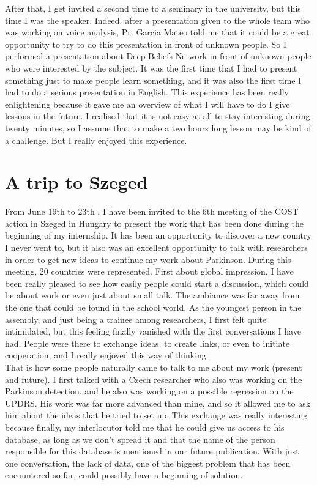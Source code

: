 \documentclass{report}
\begin{document}
		After that, I get invited a second time to a seminary in the university, but this time I was the speaker.  Indeed, after a presentation given to the whole team who was working on voice analysis, Pr. Garcia Mateo told me that it could be a great opportunity to try to do this presentation in front of unknown people. So I performed a presentation about Deep Beliefs Network in front of unknown people who were interested by the subject. It was the first time that I had to present something just to make people learn something, and it was also the first time I had to do a serious presentation in English. This experience has been really enlightening because it gave me an overview of what I will have to do I give lessons in the future. I realised that it is not easy at all to stay interesting during twenty minutes, so I assume that to make a two hours long lesson may be kind of a challenge. But I really enjoyed this experience.
		
		\section{A trip to Szeged}
		
		From June 19th to 23th   , I have been invited to the 6th meeting of the COST action in Szeged in Hungary to present the work that has been done during the beginning of my internship. It has been an opportunity to discover a new country I never went to, but it also was an excellent opportunity to talk with researchers in order to get new ideas to continue my work about Parkinson. During this meeting, 20 countries were represented.
		First about global impression, I have been really pleased to see how easily people could start a discussion, which could be about work or even just about small talk. The ambiance was far away from the one that could be found in the school world. As the youngest person in the assembly, and just being a trainee among researchers, I first felt quite intimidated, but this feeling finally vanished with the first conversations I have had. People were there to exchange ideas, to create links, or even to initiate cooperation, and I really enjoyed this way of thinking.\\
		
		That is how some people naturally came to talk to me about my work (present and future). I first talked with a Czech researcher who also was working on the Parkinson detection, and he also was working on a possible regression on the UPDRS. His work was far more advanced than mine, and so it allowed me to ask him about the ideas that he tried to set up. This exchange was really interesting because finally, my interlocutor told me that he could give us access to his database, as long as we don't spread it and that the name of the person responsible for this database is mentioned in our future publication. With just one conversation, the lack of data, one of the biggest problem that has been encountered so far, could possibly have a beginning of solution.\\
		
\end{document}
